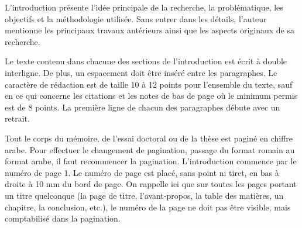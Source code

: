 \begin{introduction}

L’introduction présente l’idée principale de la recherche, la problématique, les objectifs et la méthodologie utilisée. Sans entrer dans les détails, l’auteur mentionne les principaux travaux antérieurs ainsi que les aspects originaux de sa recherche.

Le texte contenu dans chacune des sections de l’introduction est écrit à double interligne. De plus, un espacement doit être inséré entre les paragraphes. Le caractère de rédaction est de taille 10 à 12 points pour l’ensemble du texte, sauf en ce qui concerne les citations et les notes de bas de page où le minimum permis est de 8 points. La première ligne de chacun des paragraphes débute avec un retrait.

Tout le corps du mémoire, de l’essai doctoral ou de la thèse est paginé en chiffre arabe. Pour effectuer le changement de pagination, passage du format romain au format arabe, il faut recommencer la pagination. L’introduction commence par le numéro de page 1. Le numéro de page est placé, sans point ni tiret, en bas à droite à 10 mm du bord de page. On rappelle ici que sur toutes les pages portant un titre quelconque (la page de titre, l'avant-propos, la table des matières, un chapitre, la conclusion, etc.), le numéro de la page ne doit pas être visible, mais comptabilisé dans la pagination.

\end{introduction}
